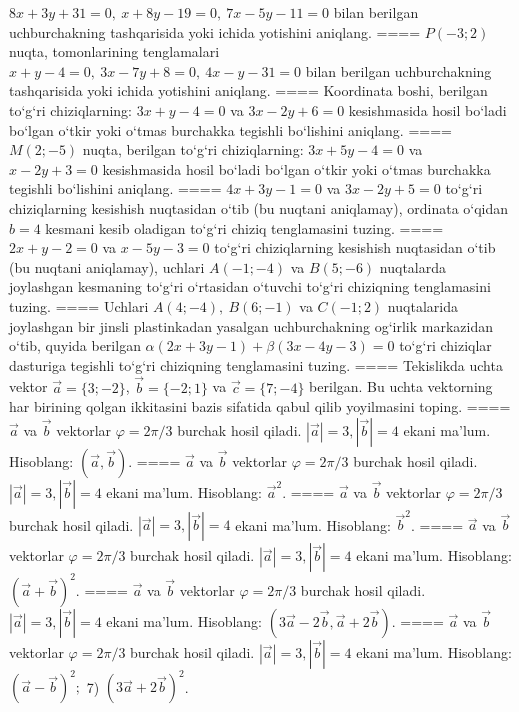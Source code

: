 \(8x+3y+31=0,\ x+8y-19=0,\ 7x-5y-11=0\) bilan
berilgan uchburchakning tashqarisida yoki ichida yotishini aniqlang.
====
\(P (-3;2) \) nuqta, tomonlarining tenglamalari
\(x+y-4=0,\ 3x-7y+8=0,\ 4x-y-31=0\) bilan
berilgan uchburchakning tashqarisida yoki ichida yotishini aniqlang.
====
Koordinata boshi, berilgan to‘g‘ri chiziqlarning:
\(3x+y-4=0\) va \(3x-2y+6=0\) kesishmasida hosil bo‘ladi
bo‘lgan o‘tkir yoki o‘tmas burchakka tegishli bo‘lishini aniqlang.
====
\(M (2;-5) \) nuqta, berilgan to‘g‘ri chiziqlarning:
\(3x+5y-4=0\) va \(x-2y+3=0\) kesishmasida hosil bo‘ladi
bo‘lgan o‘tkir yoki o‘tmas burchakka tegishli bo‘lishini aniqlang.
====
\(4x+3y-1=0\) va \(3x-2y+5=0\)
to‘g‘ri chiziqlarning kesishish nuqtasidan o‘tib (bu nuqtani aniqlamay), ordinata
o‘qidan \(b=4\) kesmani kesib oladigan to‘g‘ri chiziq tenglamasini tuzing.
====
\(2x+y-2=0\) va \(x-5y-3=0\)
to‘g‘ri chiziqlarning kesishish nuqtasidan o‘tib (bu nuqtani aniqlamay), uchlari
\(A (-1;-4) \) va \(B (5;-6) \) nuqtalarda joylashgan kesmaning
to‘g‘ri o‘rtasidan o‘tuvchi to‘g‘ri chiziqning tenglamasini tuzing.
====
Uchlari \(A (4;-4),\ B (6;-1) \) va \(C (-1;2) \)
nuqtalarida joylashgan bir jinsli plastinkadan yasalgan uchburchakning
og‘irlik markazidan o‘tib, quyida berilgan
\(\alpha (2x+3y-1) +\beta (3x-4y-3) =0\) to‘g‘ri chiziqlar dasturiga
tegishli to‘g‘ri chiziqning tenglamasini tuzing.
====
Tekislikda uchta vektor $\vec{a} = \{ 3; - 2\}$, $\vec{b} = \{ - 2;1\}$ va $\vec{c} = \{ 7; - 4\}$ berilgan. Bu uchta vektorning har birining qolgan ikkitasini bazis sifatida qabul qilib yoyilmasini toping.
====
$\vec{a}$ va $\vec{b}$ vektorlar $\varphi = 2\pi/3$ burchak hosil qiladi. $|\vec{a}| = 3,|\vec{b}| = 4$ ekani ma’lum. Hisoblang:
$\left(\vec{a},\vec{b} \right) $.
====
$\vec{a}$ va $\vec{b}$ vektorlar $\varphi = 2\pi/3$ burchak hosil qiladi. $|\vec{a}| = 3,|\vec{b}| = 4$ ekani ma’lum. Hisoblang:
${\vec{a}}^{2}$.
====
$\vec{a}$ va $\vec{b}$ vektorlar $\varphi = 2\pi/3$ burchak hosil qiladi. $|\vec{a}| = 3,|\vec{b}| = 4$ ekani ma’lum. Hisoblang:
${\vec{b}}^{2}$.
====
$\vec{a}$ va $\vec{b}$ vektorlar $\varphi = 2\pi/3$ burchak hosil qiladi. $|\vec{a}| = 3,|\vec{b}| = 4$ ekani ma’lum. Hisoblang:
$ (\vec{a} + \vec{b}) ^{2}$.
====
$\vec{a}$ va $\vec{b}$ vektorlar $\varphi = 2\pi/3$ burchak hosil qiladi. $|\vec{a}| = 3,|\vec{b}| = 4$ ekani ma’lum. Hisoblang:
$\left(3\vec{a} - 2\vec{b},\vec{a} + 2\vec{b} \right) $.
====
$\vec{a}$ va $\vec{b}$ vektorlar $\varphi = 2\pi/3$ burchak hosil qiladi. $|\vec{a}| = 3,|\vec{b}| = 4$ ekani ma’lum. Hisoblang:
$ (\vec{a} - \vec{b}) ^{2};$ 7) $ (3\vec{a} + 2\vec{b}) ^{2}$.
